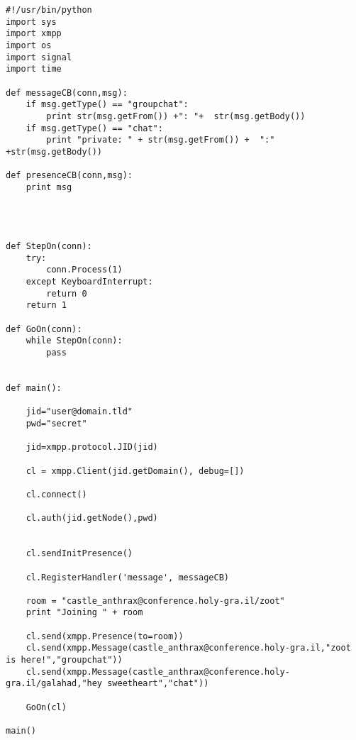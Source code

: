 \begin{verbatim}
#!/usr/bin/python
import sys
import xmpp
import os
import signal
import time

def messageCB(conn,msg):
	if msg.getType() == "groupchat":
		print str(msg.getFrom()) +": "+  str(msg.getBody())
	if msg.getType() == "chat":
		print "private: " + str(msg.getFrom()) +  ":" +str(msg.getBody())

def presenceCB(conn,msg):
	print msg




def StepOn(conn):
    try:
        conn.Process(1)
    except KeyboardInterrupt:
	    return 0
    return 1

def GoOn(conn):
    while StepOn(conn):
	    pass


def main():

	jid="user@domain.tld"
	pwd="secret"

	jid=xmpp.protocol.JID(jid)

	cl = xmpp.Client(jid.getDomain(), debug=[])

	cl.connect()

	cl.auth(jid.getNode(),pwd)


	cl.sendInitPresence()

	cl.RegisterHandler('message', messageCB)

	room = "castle_anthrax@conference.holy-gra.il/zoot"
	print "Joining " + room

	cl.send(xmpp.Presence(to=room))
	cl.send(xmpp.Message(castle_anthrax@conference.holy-gra.il,"zoot is here!","groupchat"))
	cl.send(xmpp.Message(castle_anthrax@conference.holy-gra.il/galahad,"hey sweetheart","chat"))

	GoOn(cl)

main()
\end{verbatim}